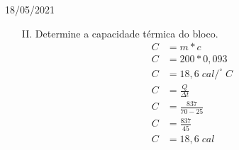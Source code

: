 \documentclass{SchoolBook}
\begin{document}
\begin{day}{18/05/2021}
\begin{enumerate}
\begin{enumerate}
\begin{enumerate}
                    \item[II.] Determine a capacidade térmica do bloco.
                    \begin{align*}
                        C &= m * c               \\
                        C &= 200 * 0,093         \\
                        C &= 18,6\;cal/^\circ\;C \\[6pt]
                        C &= \frac{Q}{\Delta t}  \\
                        C &= \frac{837}{70 - 25} \\
                        C &= \frac{837}{45}      \\
                        C &= 18,6\;cal
                    \end{align*}
                \end{enumerate}
            \end{enumerate}
        \end{enumerate}
    \end{day}
    
\end{document}
